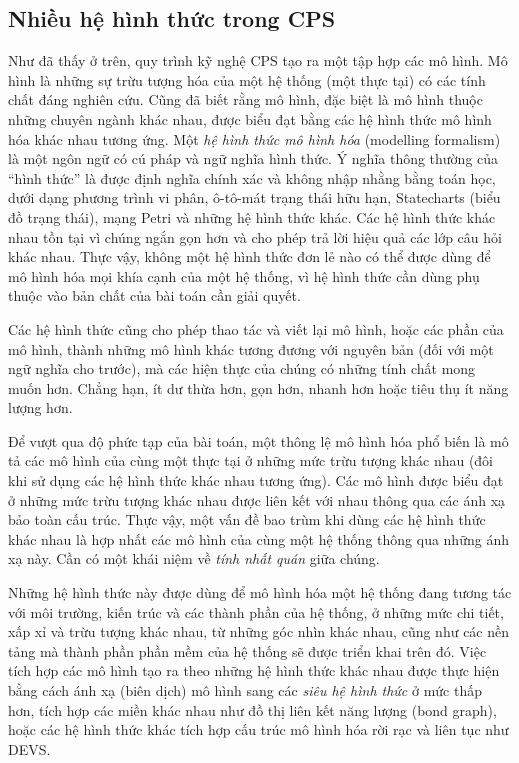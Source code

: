 \subsection{Nhiều hệ hình thức trong CPS}
Như đã thấy ở trên, quy trình kỹ nghệ CPS tạo ra một tập hợp các mô hình. Mô hình là những sự trừu tượng hóa của một hệ thống (một thực tại) có các tính chất đáng nghiên cứu. Cũng đã biết rằng mô hình, đặc biệt là mô hình thuộc những chuyên ngành khác nhau, được biểu đạt bằng các hệ hình thức mô hình hóa khác nhau tương ứng. Một \emph{hệ hình thức mô hình hóa} (modelling formalism) là một ngôn ngữ có cú pháp và ngữ nghĩa hình thức. Ý nghĩa thông thường của ``hình thức'' là được định nghĩa chính xác và không nhập nhằng bằng toán học, dưới dạng phương trình vi phân, ô-tô-mát trạng thái hữu hạn, Statecharts (biểu đồ trạng thái), mạng Petri và những hệ hình thức khác. Các hệ hình thức khác nhau tồn tại vì chúng ngắn gọn hơn và cho phép trả lời hiệu quả các lớp câu hỏi khác nhau. Thực vậy, không một hệ hình thức đơn lẻ nào có thể được dùng để mô hình hóa mọi khía cạnh của một hệ thống, vì hệ hình thức cần dùng phụ thuộc vào bản chất của bài toán cần giải quyết.

Các hệ hình thức cũng cho phép thao tác và viết lại mô hình, hoặc các phần của mô hình, thành những mô hình khác tương đương với nguyên bản (đối với một ngữ nghĩa cho trước), mà các hiện thực của chúng có những tính chất mong muốn hơn. Chẳng hạn, ít dư thừa hơn, gọn hơn, nhanh hơn hoặc tiêu thụ ít năng lượng hơn.

Để vượt qua độ phức tạp của bài toán, một thông lệ mô hình hóa phổ biến là mô tả các mô hình của cùng một thực tại ở những mức trừu tượng khác nhau (đôi khi sử dụng các hệ hình thức khác nhau tương ứng). Các mô hình được biểu đạt ở những mức trừu tượng khác nhau được liên kết với nhau thông qua các ánh xạ bảo toàn cấu trúc. Thực vậy, một vấn đề bao trùm khi dùng các hệ hình thức khác nhau là hợp nhất các mô hình của cùng một hệ thống thông qua những ánh xạ này. Cần có một khái niệm về \emph{tính nhất quán} giữa chúng.

Những hệ hình thức này được dùng để mô hình hóa một hệ thống đang tương tác với môi trường, kiến trúc và các thành phần của hệ thống, ở những mức chi tiết, xấp xỉ và trừu tượng khác nhau, từ những góc nhìn khác nhau, cũng như các nền tảng mà thành phần phần mềm của hệ thống sẽ được triển khai trên đó. Việc tích hợp các mô hình tạo ra theo những hệ hình thức khác nhau được thực hiện bằng cách ánh xạ (biên dịch) mô hình sang các \emph{siêu hệ hình thức} ở mức thấp hơn, tích hợp các miền khác nhau như đồ thị liên kết năng lượng (bond graph), hoặc các hệ hình thức khác tích hợp cấu trúc mô hình hóa rời rạc và liên tục như DEVS.

